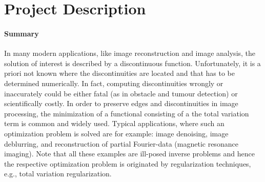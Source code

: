 \documentclass[enabledeprecatedfontcommands,cleardoublepage=empty,headsepline,twoside,11pt,DIV=15,BCOR=12mm,final]{scrartcl}
\begin{document}
%
\section*{Project Description}

\paragraph*{Summary} 

In many modern applications, like image reconstruction and image analysis, the solution of interest is described by a discontinuous function. Unfortunately, it is a priori not known where the discontinuities  are located and that has to be determined numerically. In fact, computing discontinuities wrongly or inaccurately could be either fatal (as in obstacle and tumour detection) or scientifically costly.  %
In order to preserve edges and discontinuities  in image processing, the minimization of a functional consisting of a the total variation term is common and widely used. Typical applications, where such an optimization problem is solved are for example: image denoising, image deblurring, and reconstruction of partial Fourier-data (magnetic resonance imaging). Note that all these examples are ill-posed inverse problems and hence the respective optimization problem is originated by regularization techniques, e.g., total variation regularization.
\end{document}
